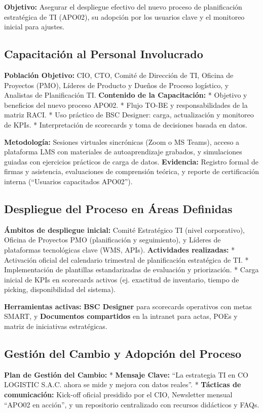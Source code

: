 \documentclass[11pt]{article}
\begin{document}
\textbf{Objetivo:} Asegurar el despliegue efectivo del nuevo proceso de planificación estratégica de TI (APO02), su adopción por los usuarios clave y el monitoreo inicial para ajustes.

\subsection{Capacitación al Personal Involucrado}
\textbf{Población Objetivo:} CIO, CTO, Comité de Dirección de TI, Oficina de Proyectos (PMO), Líderes de Producto y Dueños de Proceso logístico, y Analistas de Planificación TI.
\textbf{Contenido de la Capacitación:}
* Objetivo y beneficios del nuevo proceso APO02.
* Flujo TO-BE y responsabilidades de la matriz RACI.
* Uso práctico de BSC Designer: carga, actualización y monitoreo de KPIs.
* Interpretación de scorecards y toma de decisiones basada en datos.

\textbf{Metodología:} Sesiones virtuales sincrónicas (Zoom o MS Teams), acceso a plataforma LMS con materiales de autoaprendizaje grabados, y simulaciones guiadas con ejercicios prácticos de carga de datos.
\textbf{Evidencia:} Registro formal de firmas y asistencia, evaluaciones de comprensión teórica, y reporte de certificación interna (``Usuarios capacitados APO02'').

\subsection{Despliegue del Proceso en Áreas Definidas}
\textbf{Ámbitos de despliegue inicial:} Comité Estratégico TI (nivel corporativo), Oficina de Proyectos PMO (planificación y seguimiento), y Líderes de plataformas tecnológicas clave (WMS, APIs).
\textbf{Actividades realizadas:}
* Activación oficial del calendario trimestral de planificación estratégica de TI.
* Implementación de plantillas estandarizadas de evaluación y priorización.
* Carga inicial de KPIs en scorecards activos (ej. exactitud de inventario, tiempo de picking, disponibilidad del sistema).

\textbf{Herramientas activas:} \textbf{BSC Designer} para scorecards operativos con metas SMART, y \textbf{Documentos compartidos} en la intranet para actas, POEs y matriz de iniciativas estratégicas.

\subsection{Gestión del Cambio y Adopción del Proceso}
\textbf{Plan de Gestión del Cambio:}
* \textbf{Mensaje Clave:} ``La estrategia TI en CO LOGISTIC S.A.C. ahora se mide y mejora con datos reales''.
* \textbf{Tácticas de comunicación:} Kick-off oficial presidido por el CIO, Newsletter mensual ``APO02 en acción'', y un repositorio centralizado con recursos didácticos y FAQs.
\end{document}
